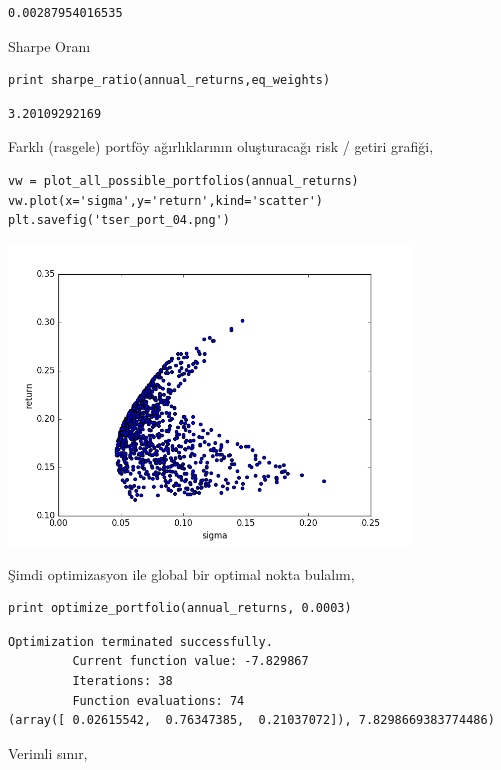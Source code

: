 \documentclass[12pt,fleqn]{article}\usepackage{../../common}
\begin{document}
\begin{verbatim}
0.00287954016535
\end{verbatim}

Sharpe Oranı

\begin{verbatim}
print sharpe_ratio(annual_returns,eq_weights)
\end{verbatim}

\begin{verbatim}
3.20109292169
\end{verbatim}

Farklı (rasgele) portföy ağırlıklarının oluşturacağı risk / getiri grafiği, 

\begin{verbatim}
vw = plot_all_possible_portfolios(annual_returns)
vw.plot(x='sigma',y='return',kind='scatter')
plt.savefig('tser_port_04.png')
\end{verbatim}

\includegraphics[height=8cm]{tser_port_04.png}

Şimdi optimizasyon ile global bir optimal nokta bulalım,

\begin{verbatim}
print optimize_portfolio(annual_returns, 0.0003)
\end{verbatim}

\begin{verbatim}
Optimization terminated successfully.
         Current function value: -7.829867
         Iterations: 38
         Function evaluations: 74
(array([ 0.02615542,  0.76347385,  0.21037072]), 7.8298669383774486)
\end{verbatim}

Verimli sınır,
\end{document}
